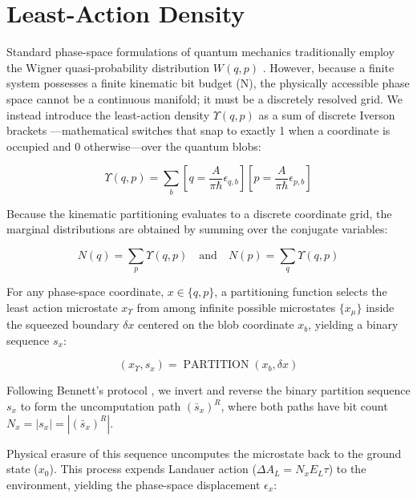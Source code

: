 \documentclass[%
  aps, reprint, prl, amsmath,amssymb
]{revtex4-2}
\begin{document}
\section{Least-Action Density}


Standard phase-space formulations of quantum mechanics traditionally employ the Wigner quasi-probability distribution $W(q,p)$ \cite{Wigner1932}. However, because a finite system possesses a finite kinematic bit budget (N), the physically accessible phase space cannot be a continuous manifold; it must be a discretely resolved grid. We instead introduce the least-action density $\Upsilon(q,p)$ as a sum of discrete Iverson brackets \cite{Knuth1992}—mathematical switches that snap to exactly 1 when a coordinate is occupied and 0 otherwise—over the quantum blobs:

\begin{equation}
\label{eq:JointErasure}
\Upsilon(q,p) = \sum_{b} \left[ q = \frac{A}{\pi \hbar} \epsilon_{q,b} \right] \left[ p = \frac{A}{\pi \hbar} \epsilon_{p,b} \right]
\end{equation}

Because the kinematic partitioning evaluates to a discrete coordinate grid, the marginal distributions are obtained by summing over the conjugate variables:

\begin{equation}
\label{eq:Marginals}
N(q) = \sum_{p} \Upsilon(q,p)
\quad \text{and} \quad
N(p) = \sum_{q} \Upsilon(q,p)
\end{equation}

For any phase-space coordinate, $x \in \{q, p\}$, a partitioning function selects the least action microstate $x_\Upsilon$ from among infinite possible microstates $\{x_\mu\}$ inside the squeezed boundary $\delta x$ centered on the blob coordinate $x_b$, yielding a binary sequence $s_x$:

\begin{equation}
\label{eq:PartitionFunction}
(x_\Upsilon, s_x) = \operatorname{PARTITION}(x_b, \delta x)
\end{equation}

Following Bennett's protocol \cite{Bennett1973}, we invert and reverse the binary partition sequence $s_x$ to form the uncomputation path $(\bar{s}_x)^R$, where both paths have bit count $N_x = |s_x| = |(\bar{s}_x)^R|$.

Physical erasure of this sequence uncomputes the microstate back to the ground state ($x_0$). This process expends Landauer action ($\Delta A_L = N_x E_L \tau$) to the environment, yielding the phase-space displacement $\epsilon_x$:
\end{document}
